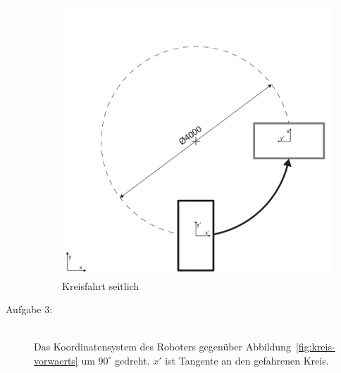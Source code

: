 \begin{description}
    \begin{figure}[H]
        \centering
        \includegraphics[width=.6\textwidth]{Abbildungen/Viertelkreis-seitwaerts}
        \caption{Kreisfahrt seitlich}
        \label{fig:kreis-seitwaerts}
    \end{figure}
    \item[Aufgabe 3:]~\\
    Das Koordinatensystem des Roboters gegenüber Abbildung~\ref{fig:kreis-vorwaerts} um $90^\circ$ gedreht. $x'$ ist Tangente an den gefahrenen Kreis.
\end{description}
